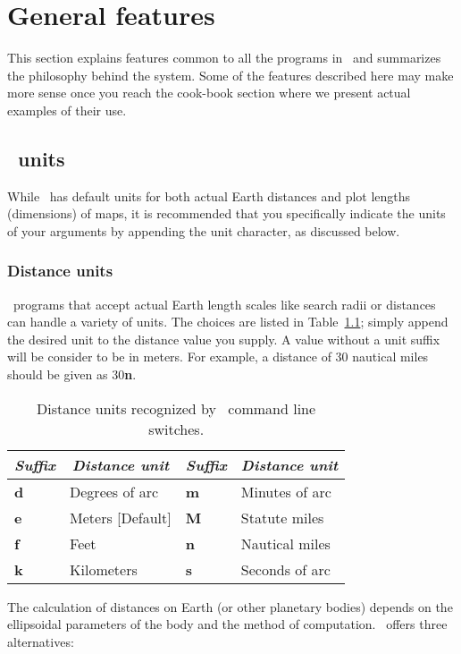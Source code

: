%
%
\chapter{General features}
\label{ch:4}
\thispagestyle{headings}

This section explains features common to all the programs
in \GMT\ and summarizes the philosophy behind the system.  Some
of the features described here may make more sense once you reach
the cook-book section where we present actual examples of their use. 

\section{\gmt\ units}

While \GMT\ has default units for both actual Earth distances and
plot lengths (dimensions) of maps, it is recommended that you specifically indicate
the units of your arguments by appending the unit character, as discussed below.

\subsection{Distance units}

\GMT\ programs that accept actual Earth length scales like search radii or distances can
handle a variety of units.  The choices are listed in Table~\ref{tbl:distunits};
simply append the desired unit to the distance value you supply.  A value without
a unit suffix will be consider to be in meters.  For example, a distance of
30 nautical miles should be given as 30{\bf n}.
\begin{table}[H]
\centering
{}%
%
\begin{tabular}{|l|l||l|l|} \hline
\multicolumn{1}{|c|}{\emph{Suffix}} & \multicolumn{1}{c|}{\emph{Distance unit}} & \multicolumn{1}{|c|}{\emph{Suffix}} & \multicolumn{1}{c|}{\emph{Distance unit}} \\ \hline
{\bf d}	&	Degrees of arc		& {\bf m}	&	Minutes of arc  \\ \hline
{\bf e}	&	Meters [Default]	& {\bf M}	&	Statute miles   \\ \hline
{\bf f}	&	Feet 			& {\bf n}	&	Nautical miles  \\ \hline
{\bf k}	&	Kilometers		& {\bf s}	&	Seconds of arc  \\ \hline
\end{tabular}
\caption{Distance units recognized by \gmt\ command line switches.}
\label{tbl:distunits}
\end{table} 
The calculation of distances on Earth (or other planetary bodies) depends on the
ellipsoidal parameters of the body and the method of computation.  \GMT\ offers
three alternatives:

